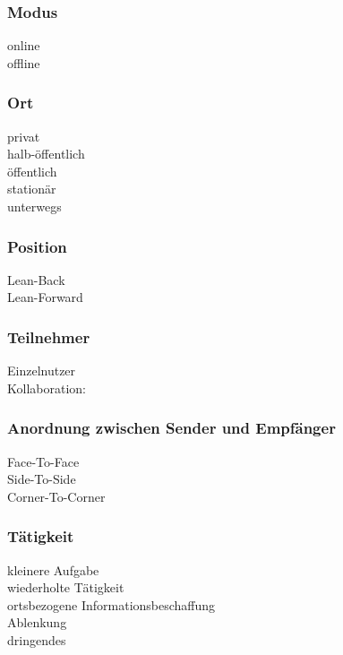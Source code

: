 \subsubsection*{Modus}
\checkbox{\online} online \\
\checkbox{\offline} offline 

\subsubsection*{Ort}
\checkbox{\private} privat \\
\checkbox{\semipublic} halb-öffentlich \\
\checkbox{\public} öffentlich \\
\checkbox{\stationary} stationär \\
\checkbox{\onthego} unterwegs 

\subsubsection*{Position}
\checkbox{\leanback} Lean-Back \\
\checkbox{\leanforward} Lean-Forward 

\subsubsection*{Teilnehmer}
\checkbox{\single} Einzelnutzer \\
\checkbox{\collaboration} Kollaboration:

\subsubsection*{Anordnung zwischen Sender und Empfänger}
\checkbox{\facetoface} Face-To-Face \\
\checkbox{\sidetoside} Side-To-Side \\
\checkbox{\cornertocorner} Corner-To-Corner

\subsubsection*{Tätigkeit}
\checkbox{\smalltask} kleinere Aufgabe \\
\checkbox{\repeatedtask} wiederholte Tätigkeit \\
\checkbox{\locationbased} ortsbezogene Informationsbeschaffung \\
\checkbox{\distraction} Ablenkung \\
\checkbox{\urgent} dringendes 


